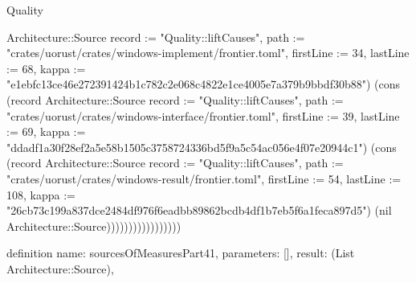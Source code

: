 \begin{lexlean}{Quality}
\begin{semanticmodule}
{Architecture::Source {record := "Quality::liftCauses", path := "crates/uorust/crates/windows-implement/frontier.toml", firstLine := 34, lastLine := 68, kappa := "e1ebfc13ce46e272391424b1c782c2e068c4822e1ce4005e7a379b9bbdf30b88"}) (cons (record Architecture::Source {record := "Quality::liftCauses", path := "crates/uorust/crates/windows-interface/frontier.toml", firstLine := 39, lastLine := 69, kappa := "ddadf1a30f28ef2a5e58b1505c3758724336bd5f9a5c54ac056e4f07e20944c1"}) (cons (record Architecture::Source {record := "Quality::liftCauses", path := "crates/uorust/crates/windows-result/frontier.toml", firstLine := 54, lastLine := 108, kappa := "26cb73c199a837dce2484df976f6eadbb89862bcdb4df1b7eb5f6a1feca897d5"}) (nil Architecture::Source)))))))))))))))))
}

definition{
  name: sourcesOfMeasuresPart41,
  parameters: [],
  result: (List Architecture::Source),
}
\end{semanticmodule}
\end{lexlean}

